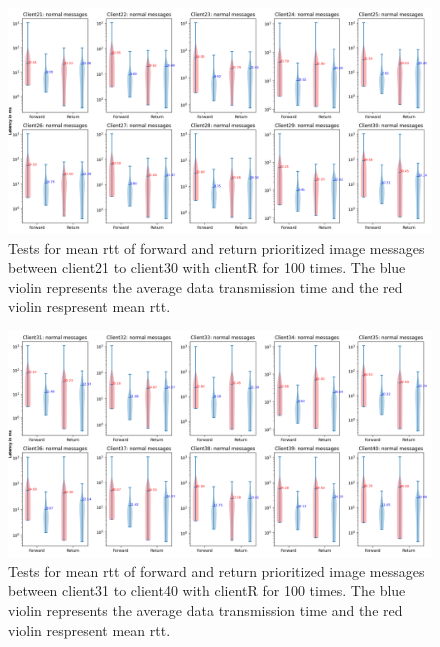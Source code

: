 \begin{figure}
    \includegraphics[width=\textheight]{figures/appendix/priority_tests/log_violin_50clients_image_figure_3.png}\hfill 
    \caption{Tests for mean \gls{rtt} of forward and return prioritized image messages between client21 to client30 
    with clientR for 100 times. The blue violin represents the average data transmission time and the red violin 
    respresent mean \gls{rtt}.} \label{fig: priority-50clients-image-c}
\end{figure}

\begin{figure}
    \includegraphics[width=\textheight]{figures/appendix/priority_tests/log_violin_50clients_image_figure_4.png}\hfill 
    \caption{Tests for mean \gls{rtt} of forward and return prioritized image messages between client31 to client40 
    with clientR for 100 times. The blue violin represents the average data transmission time and the red violin 
    respresent mean \gls{rtt}.} \label{fig: priority-50clients-image-d}
\end{figure}

